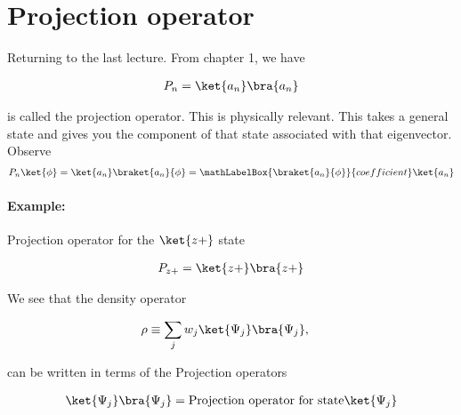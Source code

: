\section{Projection operator}

Returning to the last lecture.  From chapter 1, we have

\begin{equation}\label{eqn:PHY356Foct26:1000}
\begin{aligned}
P_n = \ket{a_n} \bra{a_n}
\end{aligned}
\end{equation}

is called the projection operator.  This is physically relevant.  This takes a general state and gives you the component of that state associated with that eigenvector.  Observe
\begin{equation}\label{eqn:PHY356Foct26:210}
\begin{aligned}
P_n \ket{\phi} =
\ket{a_n} \braket{a_n}{\phi}
=
\mathLabelBox{\braket{a_n}{\phi}}{coefficient}
\ket{a_n}
\end{aligned}
\end{equation}

\paragraph{Example:} Projection operator for the \(\ket{z+}\) state

\begin{equation}\label{eqn:PHY356Foct26:211}
\begin{aligned}
P_{z+} = \ket{z+} \bra{z+}
\end{aligned}
\end{equation}

We see that the density operator

\begin{equation}\label{eqn:PHY356HNov2:40b}
\begin{aligned}
\rho &\equiv \sum_j w_j \ket{\Psi_j} \bra{\Psi_j},
\end{aligned}
\end{equation}

can be written in terms of the Projection operators

\begin{equation}\label{eqn:lecture8makingSenseOfQM:1120}
\begin{aligned}
\ket{\Psi_j} \bra{\Psi_j} = \text{Projection operator for state} \ket{\Psi_j}
\end{aligned}
\end{equation}

